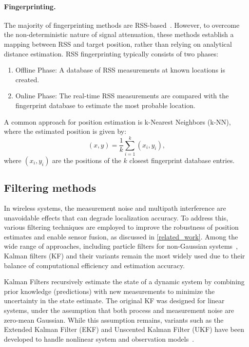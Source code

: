 \paragraph{Fingerprinting.}
The majority of fingerprinting methods are RSS-based~\cite{alarifi2016ultra}. However, to overcome the non-deterministic nature of signal attenuation, these methods establish a mapping between RSS and target position, rather than relying on analytical distance estimation. RSS fingerprinting typically consists of two phases:
\begin{enumerate}
    \item Offline Phase: A database of RSS measurements at known locations is created.
    \item Online Phase: The real-time RSS measurements are compared with the fingerprint database to estimate the most probable location.
\end{enumerate}
A common approach for position estimation is k-Nearest Neighbors (k-NN), where the estimated position is given by:
\begin{equation}
(x, y) = \frac{1}{k} \sum_{i=1}^{k} (x_i, y_i),
\end{equation}
where $(x_i, y_i)$ are the positions of the $k$ closest fingerprint database entries.

\subsection{Filtering methods}\label{kalman_theory}
In wireless systems, the measurement noise and multipath interference are unavoidable effects that can degrade localization accuracy. To address this, various filtering techniques are employed to improve the robustness of position estimates and enable sensor fusion, as discussed in \autoref{related_work}. Among the wide range of approaches, including particle filters for non-Gaussian systems~\cite{wang2014particle}, Kalman filters (KF) and their variants remain the most widely used due to their balance of computational efficiency and estimation accuracy.

Kalman Filters recursively estimate the state of a dynamic system by combining prior knowledge (predictions) with new measurements to minimize the uncertainty in the state estimate. The original KF was designed for linear systems, under the assumption that both process and measurement noise are zero-mean Gaussian. While this assumption remains, variants such as the Extended Kalman Filter (EKF) and Unscented Kalman Filter (UKF) have been developed to handle nonlinear system and observation models~\cite{wan2000unscented, konatowski2016comparison}.

